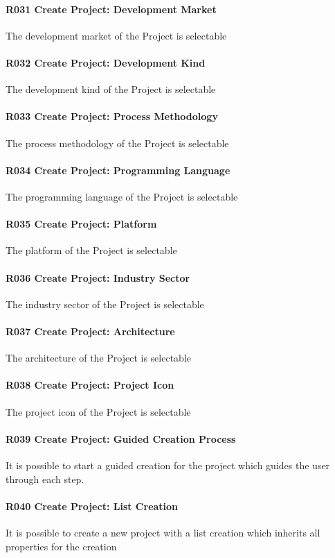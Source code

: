 \paragraph{R031 Create Project: Development Market}
The development market of the Project is selectable 
\paragraph{R032 Create Project: Development Kind}
The development kind of the Project is selectable 
\paragraph{R033 Create Project: Process Methodology}
The process methodology of the Project is selectable 
\paragraph{R034 Create Project: Programming Language}
The programming language of the Project is selectable 
\paragraph{R035 Create Project: Platform}
The platform of the Project is selectable 
\paragraph{R036 Create Project: Industry Sector}
The industry sector of the Project is selectable 
\paragraph{R037 Create Project: Architecture}
The architecture of the Project is selectable 
\paragraph{R038 Create Project: Project Icon}
The project icon of the Project is selectable 
\paragraph{R039 Create Project: Guided Creation Process}
It is possible to start a guided creation for the project which guides the user through each step.
\paragraph{R040 Create Project: List Creation}
It is possible to create a new project with a list creation which inherits all properties for the creation

